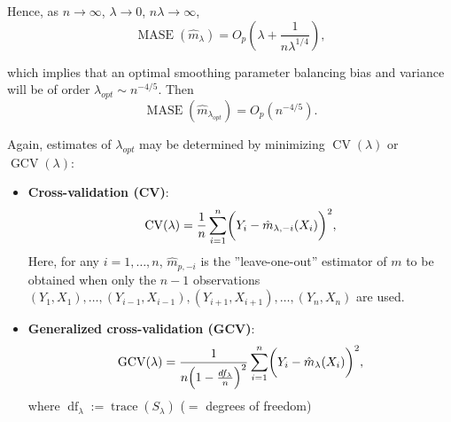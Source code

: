 \documentclass[14pt]{extreport}\usepackage[]{graphicx}\usepackage[]{xcolor}
\DeclareMathOperator{\E}{\mathbb{E}}
\begin{document}
% 
% 
% 
 
Hence, as $n\rightarrow\infty$, $\lambda\rightarrow 0$, $n\lambda\rightarrow\infty$,
$$\operatorname{MASE}(\hat m_{\lambda})=O_p\left(\lambda +\frac{1}{n\lambda^{1/4}}\right),$$

which implies that an optimal smoothing parameter balancing bias and variance will be of order $\lambda_{opt}\sim n^{-4/5}$. Then
$$\operatorname{MASE}(\hat m_{\lambda_{opt}})=O_p(n^{-4/5}).$$



\bigskip

Again, estimates of $\lambda_{opt}$ may be determined by minimizing $\operatorname{CV}(\lambda)$ or $\operatorname{GCV}(\lambda)$:

\begin{itemize}
\item {\bf Cross-validation (CV)}:
$$\operatorname{CV}(\lambda)={1 \over n} \sum_{i=1}^n\biggl( Y_i-
{\hat m}_{\lambda,-i}(X_i)\biggr)^2,$$
Here, for any $i=1,\dots,n$, ${\hat m}_{p,-i}$ is the ''leave-one-out'' estimator of
$m$ to be obtained when only the $n-1$
observations\\
$(Y_1,X_1),\dots,(Y_{i-1},X_{i-1}),(Y_{i+1},X_{i+1}),\dots,
(Y_{n},X_{n})$ are used.
\item {\bf Generalized cross-validation (GCV)}:
$$\operatorname{GCV}(\lambda)={1\over n\Big(1-{df_\lambda\over n}\Big)^2}\sum_{i=1}^n \biggl( Y_i-
{\hat m}_\lambda(X_i)\biggr)^2,$$
where $\operatorname{df}_\lambda:=\operatorname{trace}(S_\lambda)$ ($=$ degrees of freedom)
\end{itemize}
\end{document}
